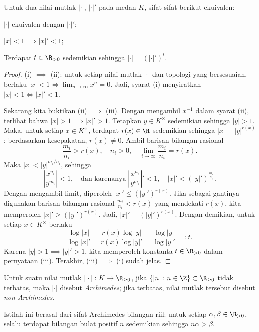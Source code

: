 \begin{lemma}\label{prop:abs-equivalence}
	Untuk dua nilai mutlak $|\cdot|$, $|\cdot|'$ pada medan $K$, sifat-sifat berikut ekuivalen:
	\begin{compactenum}[(i)]
		\item $|\cdot|$ ekuivalen dengan $|\cdot|'$;
		\item $|x| < 1 \implies |x|' < 1$;
		\item Terdapat $t \in \R_{> 0}$ sedemikian sehingga $|\cdot| = (|\cdot|')^t$.
	\end{compactenum}
\end{lemma}
\begin{proof}
	(i) $\implies$ (ii): untuk setiap nilai mutlak $|\cdot|$ dan topologi yang bersesuaian, berlaku $|x| < 1 \iff \lim_{n \to \infty} x^n = 0$. Jadi, syarat (i) menyiratkan $|x| < 1 \iff |x|' < 1$.
	
	Sekarang kita buktikan (ii) $\implies$ (iii). Dengan mengambil $x^{-1}$ dalam syarat (ii), terlihat bahwa $|x| > 1 \implies |x|' > 1$. Tetapkan $y \in K^\times$ sedemikian sehingga $|y|>1$. Maka, untuk setiap $x \in K^\times$, terdapat $r(x) \in \R$ sedemikian sehingga $|x|=|y|^{r(x)}$; berdasarkan kesepakatan, $r(x) \neq 0$. Ambil barisan bilangan rasional
	\[ \frac{m_i}{n_i} > r(x), \quad n_i > 0, \quad \lim_{i \to \infty} \frac{m_i}{n_i} = r(x). \]
	Maka $|x| < |y|^{m_i/n_i}$, sehingga
	\[ \left| \frac{x^{n_i}}{y^{m_i}} \right| < 1, \quad \text{dan karenanya}\; \left| \frac{x^{n_i}}{y^{m_i}} \right|' < 1, \quad |x|' < (|y|')^{\frac{m_i}{n_i}}. \]
	Dengan mengambil limit, diperoleh $|x|' \leq (|y|')^{r(x)}$. Jika sebagai gantinya digunakan barisan bilangan rasional $\frac{m_i}{n_i} < r(x)$ yang mendekati $r(x)$, kita memperoleh $|x|' \geq (|y|')^{r(x)}$. Jadi, $|x|' = (|y|')^{r(x)}$. Dengan demikian, untuk setiap $x \in K^\times$ berlaku
	\[ \frac{\log|x|}{\log|x|'} = \frac{r(x) \log|y|}{r(x) \log|y|'} = \frac{\log|y|}{\log|y|'} =: t. \]
	Karena $|y| > 1 \implies |y|' > 1$, kita memperoleh konstanta $t \in \R_{>0}$ dalam pernyataan (iii). Terakhir, (iii) $\implies$ (i) sudah jelas.
\end{proof}

\begin{definition}
	Untuk suatu nilai mutlak $|\cdot|: K \to \R_{\geq 0}$, jika $\{ |n|: n \in \Z\} \subset \R_{\geq 0}$ tidak terbatas, maka $|\cdot|$ disebut \emph{Archimedes}; jika terbatas, nilai mutlak tersebut disebut \emph{non-Archimedes}.
\end{definition}
Istilah ini berasal dari sifat Archimedes bilangan riil: untuk setiap $\alpha,\beta \in \R_{> 0}$, selalu terdapat bilangan bulat positif $n$ sedemikian sehingga $n\alpha > \beta$.

